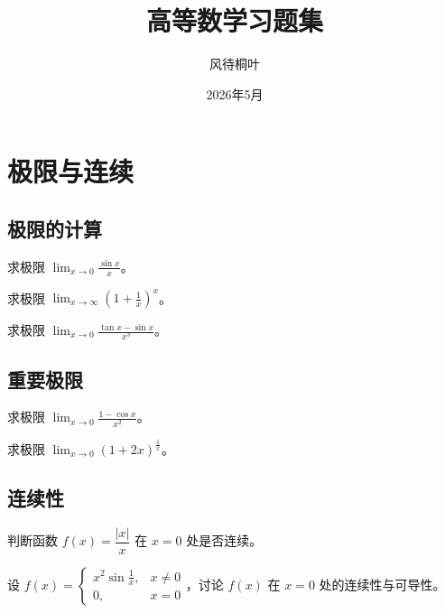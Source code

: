 \documentclass[pad]{kazetex}
\title{高等数学习题集}
\author{风待桐叶}
\date{2026年5月}
\begin{document}
\maketitle

\tableofcontents
\newpage

\section{极限与连续}

\subsection{极限的计算}

\begin{problem}
  求极限 $\displaystyle\lim_{x\to 0}\frac{\sin x}{x}$。
\end{problem}

\begin{problem}
  求极限 $\displaystyle\lim_{x\to\infty}\left(1+\frac{1}{x}\right)^x$。
\end{problem}

\begin{problem}
  求极限 $\displaystyle\lim_{x\to 0}\frac{\tan x - \sin x}{x^3}$。
\end{problem}

\subsection{重要极限}

\begin{problem}
  求极限 $\displaystyle\lim_{x\to 0}\frac{1-\cos x}{x^2}$。
\end{problem}

\begin{problem}
  求极限 $\displaystyle\lim_{x\to 0}(1+2x)^{\frac{1}{x}}$。
\end{problem}

\subsection{连续性}

\begin{problem}
  判断函数 $f(x)=\dfrac{|x|}{x}$ 在 $x=0$ 处是否连续。
\end{problem}

\begin{problem}
  设 $f(x)=\begin{cases}
    x^2\sin\frac{1}{x}, & x\neq 0\\
    0, & x=0
  \end{cases}$，讨论 $f(x)$ 在 $x=0$ 处的连续性与可导性。
\end{problem}
\end{document}
